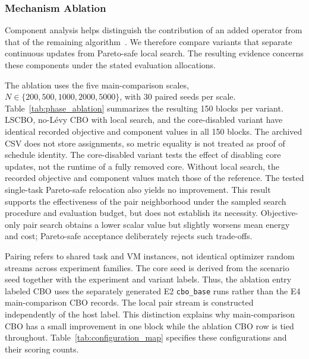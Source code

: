 \documentclass[pdflatex,onecolumn,sn-mathphys-num]{sn-jnl}
\begin{document}
\FloatBarrier

\subsubsection{Mechanism Ablation}\label{sec:phase_ablation}
Component analysis helps distinguish the contribution of an added operator from that of the remaining algorithm~\cite{LaTorre2021}. We therefore compare variants that separate continuous updates from Pareto-safe local search. The resulting evidence concerns these components under the stated evaluation allocations.

The ablation uses the five main-comparison scales, $N\in\{200,500,1000,2000,5000\}$, with 30 paired seeds per scale. Table~\ref{tab:phase_ablation} summarizes the resulting 150 blocks per variant. LSCBO, no-L\'{e}vy CBO with local search, and the core-disabled variant have identical recorded objective and component values in all 150 blocks. The archived CSV does not store assignments, so metric equality is not treated as proof of schedule identity. The core-disabled variant tests the effect of disabling core updates, not the runtime of a fully removed core. Without local search, the recorded objective and component values match those of the reference. The tested single-task Pareto-safe relocation also yields no improvement. This result supports the effectiveness of the pair neighborhood under the sampled search procedure and evaluation budget, but does not establish its necessity. Objective-only pair search obtains a lower scalar value but slightly worsens mean energy and cost; Pareto-safe acceptance deliberately rejects such trade-offs.

Pairing refers to shared task and VM instances, not identical optimizer random streams across experiment families. The core seed is derived from the scenario seed together with the experiment and variant labels. Thus, the ablation entry labeled CBO uses the separately generated E2 \texttt{cbo\_base} runs rather than the E4 main-comparison CBO records. The local pair stream is constructed independently of the host label. This distinction explains why main-comparison CBO has a small improvement in one block while the ablation CBO row is tied throughout. Table~\ref{tab:configuration_map} specifies these configurations and their scoring counts.
\end{document}
